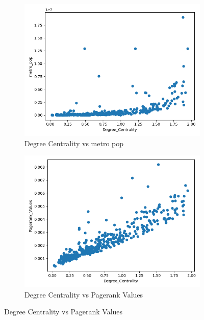 \begin{figure}[H]
     \centering
     \begin{subfigure}[b]{0.3\textwidth}
         \centering
         \includegraphics[width=\textwidth]{images/comparison/ALL/relationship_Degree_Centrality_vs_metro_pop_ALL.png}
         \caption{Degree Centrality vs metro pop}
     \end{subfigure}
     \hfill
     \begin{subfigure}[b]{0.3\textwidth}
         \centering
         \includegraphics[width=\textwidth]{images/comparison/ALL/relationship_Degree_Centrality_vs_Pagerank_Values_ALL.png}
         \centering\caption{Degree Centrality vs Pagerank Values}

\end{subfigure}
\end{figure}
